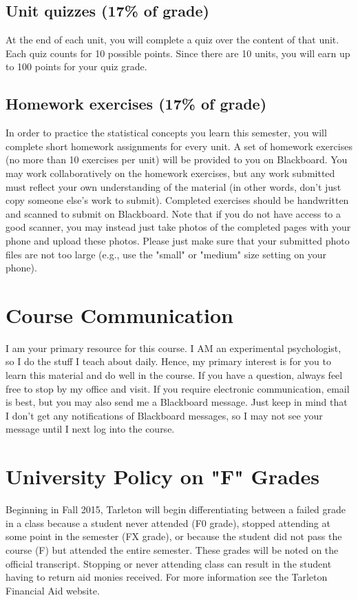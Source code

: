 \documentclass[10pt]{article}
\begin{document}
\subsection*{Unit quizzes (17\% of grade)}
\label{sec-5-2}
At the end of each unit, you will complete a quiz over the content of that 
unit. Each quiz counts for 10 possible points.  Since there are 10 units, 
you will earn up to 100 points for your quiz grade.

\subsection*{Homework exercises (17\% of grade)}
\label{sec-5-3}
In order to practice the statistical concepts you learn this semester, you will complete short homework assignments for every unit.  A set of homework exercises (no more than 10 exercises per unit) will be provided to you on Blackboard.  You may work collaboratively on the homework exercises, but any work submitted must reflect your own understanding of the material (in other words, don't just copy someone else's work to submit).  Completed exercises should be handwritten and scanned to submit on Blackboard.  Note that if you do not have access to a good scanner, you may instead just take photos of the completed pages with your phone and upload these photos.  Please just make sure that your submitted photo files are not too large (e.g., use the "small" or "medium" size setting on your phone).

\section*{Course Communication}
\label{sec-6}

I am your primary resource for this course. I AM an experimental psychologist, so I do the stuff I teach about daily. Hence, my primary interest is for you to learn this material and do well in the course. If you have a question, always feel free to stop by my office and visit.  If you require electronic communication, email is best, but you may also send me a Blackboard message.  Just keep in mind that I don't get any notifications of Blackboard messages, so I may not see your message until I next log into the course.

\section*{University Policy on "F" Grades}
\label{sec-7}
Beginning in Fall 2015, Tarleton will begin differentiating between a 
failed grade in a class because a student never attended (F0 grade), 
stopped attending at some point in the semester (FX grade), or because 
the student did not pass the course (F) but attended the entire semester. 
These grades will be noted on the official transcript. Stopping or never 
attending class can result in the student having to return aid monies 
received.  For more information see the Tarleton Financial Aid website.
\end{document}
